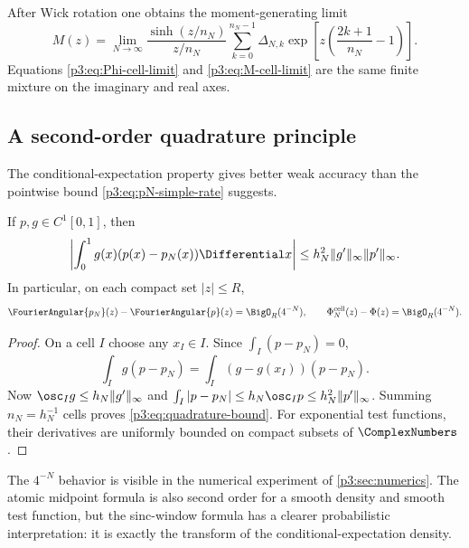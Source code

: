 \documentclass[11pt]{article}
\theoremstyle{definition}
\theoremstyle{remark}
\begin{document}
After Wick rotation one obtains the moment-generating limit
\begin{equation}\label{p3:eq:M-cell-limit}
 M(z)=\lim_{N\to\infty}
 \frac{\sinh(z/n_N)}{z/n_N}
 \sum_{k=0}^{n_N-1}\Delta_{N,k}
 \exp\!\left[z\left(\frac{2k+1}{n_N}-1\right)\right].
\end{equation}
Equations \eqref{p3:eq:Phi-cell-limit} and \eqref{p3:eq:M-cell-limit} are the same
finite mixture on the imaginary and real axes.

\subsection{A second-order quadrature principle}

The conditional-expectation property gives better weak accuracy than the
pointwise bound \eqref{p3:eq:pN-simple-rate} suggests.

\begin{proposition}
\label{p3:prop:cell-quadrature}
If $p,g\in C^1[0,1]$, then
\begin{equation}\label{p3:eq:quadrature-bound}
 \left|\int_0^1g(x)(p(x)-p_N(x))\Differential x\right|
 \le h_N^2\|g'\|_\infty\|p'\|_\infty.
\end{equation}
In particular, on each compact set $|z|\le R$,
\begin{equation}\label{p3:eq:transform-O4N}
 \FourierAngular{p_N}(z)-\FourierAngular{p}(z)=\BigO_R(4^{-N}),
 \qquad
 \Phi_N^{\mathrm{cell}}(z)-\Phi(z)=\BigO_R(4^{-N}).
\end{equation}
\end{proposition}

\begin{proof}
On a cell $I$ choose any $x_I\in I$.  Since
$\int_I(p-p_N)=0$,
\[
 \int_Ig(p-p_N)=\int_I(g-g(x_I))(p-p_N).
\]
Now $\osc_Ig\le h_N\|g'\|_\infty$ and
$\int_I|p-p_N|\le h_N\osc_Ip\le h_N^2\|p'\|_\infty$.
Summing $n_N=h_N^{-1}$ cells proves \eqref{p3:eq:quadrature-bound}.
For exponential test functions, their derivatives are uniformly bounded on
compact subsets of $\ComplexNumbers$.
\end{proof}

The $4^{-N}$ behavior is visible in the numerical experiment of
\cref{p3:sec:numerics}.  The atomic midpoint formula is also second order for a
smooth density and smooth test function, but the sinc-window formula has a
clearer probabilistic interpretation: it is exactly the transform of the
conditional-expectation density.
\end{document}
